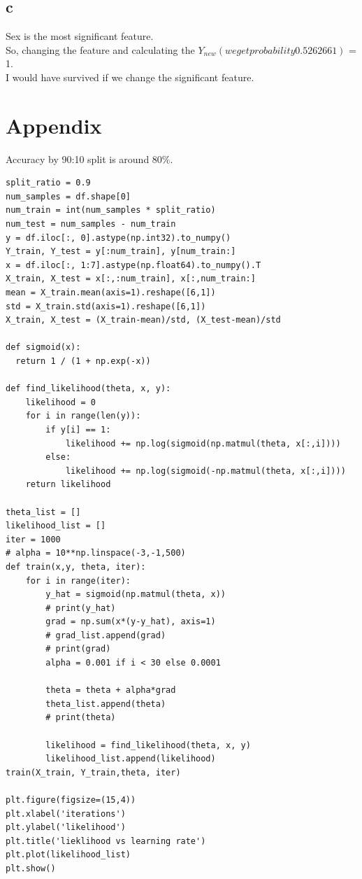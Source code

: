 \documentclass{article}
\begin{document}
\subsection{c}
Sex is the most significant feature.  \\ 
So, changing the feature and calculating the $Y_{new} \left(we get probability 0.5262661\right)$ = 1. \\
I would have survived if we change the significant feature.

\section{Appendix}
Accuracy by 90:10 split is around 80\%. \\
\begin{lstlisting}
split_ratio = 0.9
num_samples = df.shape[0]
num_train = int(num_samples * split_ratio)
num_test = num_samples - num_train
y = df.iloc[:, 0].astype(np.int32).to_numpy()
Y_train, Y_test = y[:num_train], y[num_train:]
x = df.iloc[:, 1:7].astype(np.float64).to_numpy().T
X_train, X_test = x[:,:num_train], x[:,num_train:]
mean = X_train.mean(axis=1).reshape([6,1])
std = X_train.std(axis=1).reshape([6,1])
X_train, X_test = (X_train-mean)/std, (X_test-mean)/std

def sigmoid(x):
  return 1 / (1 + np.exp(-x))

def find_likelihood(theta, x, y):
    likelihood = 0
    for i in range(len(y)):
        if y[i] == 1:
            likelihood += np.log(sigmoid(np.matmul(theta, x[:,i])))
        else:
            likelihood += np.log(sigmoid(-np.matmul(theta, x[:,i])))
    return likelihood

theta_list = []
likelihood_list = []
iter = 1000
# alpha = 10**np.linspace(-3,-1,500)
def train(x,y, theta, iter):
    for i in range(iter):
        y_hat = sigmoid(np.matmul(theta, x))
        # print(y_hat)
        grad = np.sum(x*(y-y_hat), axis=1)
        # grad_list.append(grad)
        # print(grad)
        alpha = 0.001 if i < 30 else 0.0001
        
        theta = theta + alpha*grad
        theta_list.append(theta)
        # print(theta)
        
        likelihood = find_likelihood(theta, x, y)
        likelihood_list.append(likelihood)
train(X_train, Y_train,theta, iter)

plt.figure(figsize=(15,4))
plt.xlabel('iterations')
plt.ylabel('likelihood')
plt.title('lieklihood vs learning rate')
plt.plot(likelihood_list)
plt.show()


\end{lstlisting}
\end{document}
